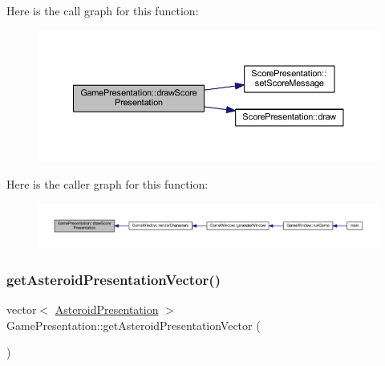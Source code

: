 Here is the call graph for this function\+:\nopagebreak
\begin{figure}[H]
\begin{center}
\leavevmode
\includegraphics[width=350pt]{class_game_presentation_a38bab53e3d75b244e14ed2d7c2710fa0_cgraph}
\end{center}
\end{figure}
Here is the caller graph for this function\+:\nopagebreak
\begin{figure}[H]
\begin{center}
\leavevmode
\includegraphics[width=350pt]{class_game_presentation_a38bab53e3d75b244e14ed2d7c2710fa0_icgraph}
\end{center}
\end{figure}
\mbox{\label{class_game_presentation_a28a7d4fb65413d6a10b960721aaca0d2}} 
\subsubsection{\texorpdfstring{get\+Asteroid\+Presentation\+Vector()}{getAsteroidPresentationVector()}}
{\footnotesize\ttfamily vector$<$ \hyperlink{class_asteroid_presentation}{Asteroid\+Presentation} $>$ Game\+Presentation\+::get\+Asteroid\+Presentation\+Vector (\begin{DoxyParamCaption}{ }\end{DoxyParamCaption})}

